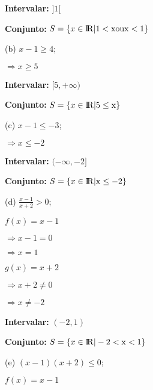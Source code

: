 \documentclass{article}
\begin{document}
		\hspace{5mm} \textbf{Intervalar:} $]1[$

		\hspace{5mm} \textbf{Conjunto:} $ S = \{x \in \rm I\!R | 1 < x ou x < 1\}$

		\vspace{5mm}
		(b) $ x - 1 \geq 4$;

		\hspace{5mm}$ \Rightarrow x \geq 5$

		\hspace{5mm} \textbf{Intervalar:} $[5, +\infty)$

		\hspace{5mm} \textbf{Conjunto:} $ S = \{x \in \rm I\!R | 5 \leq x \}$

		\vspace{5mm}
		(c) $ x - 1 \leq - 3$;

		\hspace{5mm}$ \Rightarrow x \leq -2$

		\hspace{5mm} \textbf{Intervalar:} $ (-\infty, -2]$

		\hspace{5mm} \textbf{Conjunto:} $ S = \{x \in \rm I\!R | x \leq -2 \}$

		\vspace{5mm}
		(d) $\frac {x - 1}{x + 2} > 0$;

		\hspace{5mm}$ f(x) = x - 1$

		\hspace{5mm}$ \Rightarrow x - 1 = 0 $

		\hspace{5mm}$ \Rightarrow x = 1$

		\hspace{5mm}$ g(x) = x + 2 $

		\hspace{5mm}$ \Rightarrow x + 2 \neq 0 $

		\hspace{5mm}$ \Rightarrow x \neq -2$

		\hspace{5mm} \textbf{Intervalar:} $(-2, 1)$

		\hspace{5mm} \textbf{Conjunto:} $ S = \{x \in \rm I\!R | -2 < x < 1 \}$

		\vspace{5mm}
		(e) $(x - 1)(x + 2) \leq 0$;

		\hspace{5mm}$ f(x) = x - 1$
\end{document}
